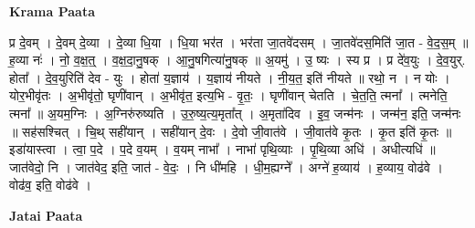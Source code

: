 \documentclass[17pt]{extarticle}
\begin{document}
\textbf{Krama Paata} \newline

प्र दे॒वम् । दे॒वम् दे॒व्या । दे॒व्या धि॒या । धि॒या भर॑त । भर॑ता जा॒तवे॑दसम् । जा॒तवे॑दस॒मिति॑ जा॒त - वे॒द॒स॒म् ॥ ह॒व्या नः॑ । नो॒ व॒क्ष॒त्॒ । व॒क्ष॒दा॒नु॒षक् । आ॒नु॒षगित्या॑नु॒षक् ॥ अ॒यमु॑ । उ॒ ष्यः । स्य प्र । प्र दे॑व॒युः । दे॒व॒युर्. होता᳚ । दे॒व॒युरिति॑ देव - युः । होता॑ य॒ज्ञाय॑ । य॒ज्ञाय॑ नीयते । नी॒य॒त॒ इति॑ नीयते ॥ रथो॒ न । न योः । योर॒भीवृ॑तः । अ॒भीवृ॑तो॒ घृणी॑वान् । अ॒भीवृ॑त॒ इत्य॒भि - वृ॒तः॒ । घृणी॑वान् चेतति । चे॒त॒ति॒ त्मना᳚ । त्मनेति॒ त्मना᳚ ॥ अ॒यम॒ग्निः । अ॒ग्निरु॑रुष्यति । उ॒रु॒ष्य॒त्य॒मृता᳚त् । अ॒मृता॑दिव । इ॒व॒ जन्म॑नः । जन्म॑न॒ इति॒ जन्म॑नः ॥ सह॑सश्चित् । चि॒थ् सही॑यान् । सही॑यान् दे॒वः । दे॒वो जी॒वात॑वे । जी॒वात॑वे कृ॒तः । कृ॒त इति॑ कृ॒तः ॥ इडा॑यास्त्वा । त्वा॒ प॒दे । प॒दे व॒यम् । व॒यम् नाभा᳚ । नाभा॑ पृथि॒व्याः । पृ॒थि॒व्या अधि॑ । अधीत्यधि॑ ॥ जात॑वेदो॒ नि । जात॑वेद॒ इति॒ जात॑ - वे॒दः॒ । नि धी॑महि । धी॒म॒ह्यग्ने᳚ । अग्ने॑ ह॒व्याय॑ । ह॒व्याय॒ वोढ॑वे । वोढ॑व॒ इति॒ वोढ॑वे । \newline

\textbf{Jatai Paata} \newline
\end{document}
